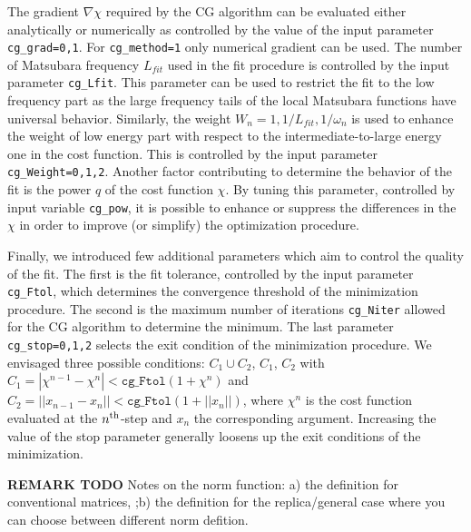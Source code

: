 \documentclass[preprint,3p,10pt]{elsarticle}
\begin{document}
The gradient $\nabla\chi$ required by the CG algorithm can be
evaluated either analytically or numerically as
controlled by the value of the input parameter \texttt{cg\_grad=0,1}. For
\texttt{cg\_method=1} only numerical gradient can be used.
The number of Matsubara frequency $L_{fit}$ used in the fit procedure
is controlled  by the input parameter \texttt{cg\_Lfit}.
This parameter can be used to restrict the fit to the low frequency
part as the large frequency tails of the local Matsubara functions
have universal behavior.
Similarly, the weight  $W_n=1,1/L_{fit},1/\omega_n$ is used to
enhance the weight of low energy part with respect to the
intermediate-to-large energy one in the cost function.
This is controlled by the input parameter \texttt{cg\_Weight=0,1,2}.
Another  factor contributing to determine the behavior
of the fit is the power $q$ of the cost function $\chi$. By tuning
this parameter, controlled by input variable \texttt{cg\_pow}, it is
possible to enhance or suppress the differences in the $\chi$ in order
to improve (or simplify) the optimization procedure.  

Finally, we introduced few additional parameters which aim to
control the quality of the fit. The first is the fit tolerance,
controlled by the input parameter \texttt{cg\_Ftol}, which
determines the convergence threshold of the minimization procedure.
The second is the maximum number of iterations \texttt{cg\_Niter}
allowed for the CG algorithm to determine the minimum.
The last parameter \texttt{cg\_stop=0,1,2} selects the exit
condition of the minimization procedure. We envisaged  three
possible conditions: $C_1\cup C_2$, $C_1$, $C_2$ with 
$C_1=|\chi^{n-1} -\chi^n|<\mathtt{cg\_Ftol}(1+\chi^n)$ and
$C_2=||x_{n-1} -x_n||<\mathtt{cg\_Ftol}(1+||x_n||)$, where $\chi^n$
is the cost function evaluated at the $n^{\rm th}$-step and $x_n$
the corresponding argument. Increasing the value of the stop
parameter generally loosens up the exit conditions of the minimization.   

{\bf REMARK TODO}
Notes on the norm function: a) the definition for conventional
matrices, ;b) the definition for the replica/general case where you
can choose between different norm defition.
\end{document}

